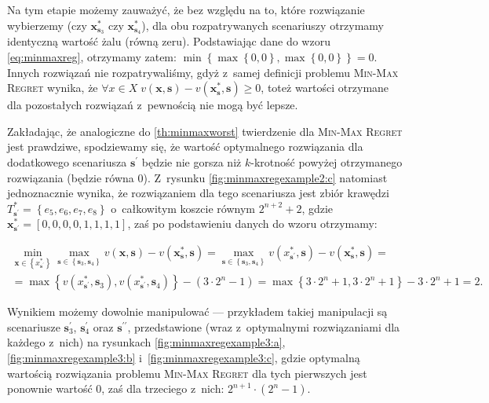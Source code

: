 Na tym etapie możemy zauważyć, że bez względu na to, które rozwiązanie wybierzemy (czy $\textbf{x}^{\ast}_{\textbf{s}_{3}}$ czy $\textbf{x}^{\ast}_{\textbf{s}_{4}}$), dla obu rozpatrywanych scenariuszy otrzymamy identyczną wartość żalu (równą zeru).
Podstawiając dane do wzoru \ref{eq:minmaxreg}, otrzymamy zatem: $\min \left\{ \max \left\{ 0, 0 \right\} , \max \left\{ 0, 0 \right\} \right\} = 0$.
Innych rozwiązań nie rozpatrywaliśmy, gdyż z~samej definicji problemu \textsc{Min-Max Regret} wynika, że $\forall x \in X \; v \left( \textbf{x}, \textbf{s} \right) - v \left( \textbf{x}^{\ast}_{\textbf{s}}, \textbf{s} \right) \geqslant 0$, toteż wartości otrzymane dla pozostałych rozwiązań z~pewnością nie mogą być lepsze.

Zakładając, że analogiczne do \ref{th:minmaxworst} twierdzenie dla \textsc{Min-Max Regret} jest prawdziwe, spodziewamy się, że wartość optymalnego rozwiązania dla dodatkowego scenariusza $\textbf{s}^{\prime}$ będzie nie gorsza niż $k$-krotność powyżej otrzymanego rozwiązania (będzie równa $0$).
Z~rysunku \ref{fig:minmaxregexample2:c} natomiast jednoznacznie wynika, że rozwiązaniem dla tego scenariusza jest zbiór krawędzi $T^{\ast}_{\textbf{s}^{\prime}} = \left\{ e_{5}, e_{6}, e_{7}, e_{8} \right\}$ o~całkowitym koszcie równym $2^{n+2} + 2$, gdzie $\textbf{x}^{\ast}_{\textbf{s}^{\prime}} = \left[ 0, 0, 0, 0, 1, 1, 1, 1 \right]$, zaś po podstawieniu danych do wzoru otrzymamy:

\begin{gather*}
	\min_{\textbf{x} \in \left\{ x^{\ast}_{\textbf{s}^{\prime}} \right\}} \max_{\textbf{s} \in \left\{ \textbf{s}_{3}, \textbf{s}_{4} \right\}} v \left( \textbf{x}, \textbf{s} \right) - v \left( \textbf{x}^{\ast}_{\textbf{s}}, \textbf{s} \right) = \max_{\textbf{s} \in \left\{ \textbf{s}_{3}, \textbf{s}_{4} \right\}} v \left( x^{\ast}_{\textbf{s}^{\prime}}, \textbf{s} \right) - v \left( \textbf{x}^{\ast}_{\textbf{s}}, \textbf{s} \right) = \\ 
	= \max \left\{ v \left( x^{\ast}_{\textbf{s}^{\prime}}, \textbf{s}_{3} \right), v \left( x^{\ast}_{\textbf{s}^{\prime}}, \textbf{s}_{4} \right) \right\} - \left( 3 \cdot 2^{n} - 1 \right) = \max \left\{ 3 \cdot 2^{n} + 1, 3 \cdot 2^{n} + 1 \right\} - 3 \cdot 2^{n} + 1 = 2\text{.}
\end{gather*}

Wynikiem możemy dowolnie manipulować --- przykładem takiej manipulacji są scenariusze $\textbf{s}^{\prime}_{3}$, $\textbf{s}^{\prime}_{4}$ oraz $\textbf{s}^{\prime\prime}$, przedstawione (wraz z~optymalnymi rozwiązaniami dla każdego z~nich) na rysunkach \ref{fig:minmaxregexample3:a}, \ref{fig:minmaxregexample3:b} i~\ref{fig:minmaxregexample3:c}, gdzie optymalną wartością rozwiązania problemu \textsc{Min-Max Regret} dla tych pierwszych jest ponownie wartość $0$, zaś dla trzeciego z~nich: $2^{n+1} \cdot \left( 2^{n} - 1\right)$.


